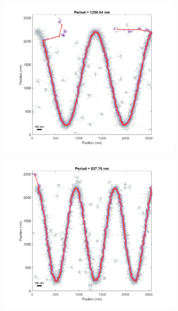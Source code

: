 \documentclass[10pt,a4paper]{article}
\begin{document}
\begin{enumerate}
\begin{figure}
	\begin{subfigure}[b]{.3\textwidth}
		\centering
		\includegraphics[width=\textwidth]{./figures/FitPoints2d_pts-1200_period-1256.png}
		\caption[Step1]{}
		\label{fig:modDepth1200_fDiv10}
	\end{subfigure}
	\begin{subfigure}[b]{.3\textwidth}
		\centering
		\includegraphics[width=\textwidth]{./figures/FitPoints2d_pts-1200_period-837.png}
		\caption[Step2]{}
		\label{fig:modDepth1200_fDiv15}

\end{subfigure}
\end{figure}
\end{enumerate}
\end{document}
